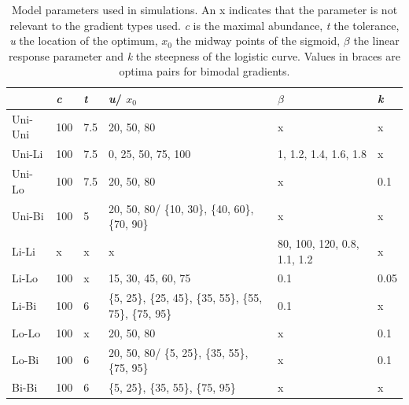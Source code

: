 		\begin{table}[h]
			\small
			\centering
			\caption{Model parameters used in simulations. An x indicates that the parameter is not relevant to the gradient types used. \textit{c} is the maximal abundance, \textit{t} the tolerance, \textit{u} the location of the optimum, $x_0$ the midway points of the sigmoid, $\beta$ the  linear response parameter and \textit{k} the steepness of the logistic curve. Values in braces are optima pairs for bimodal gradients.}
			\begin{tabular}{@{}llllll@{}}
				\toprule
				        & \textit{c} & \textit{t} & \textit{u}/ $x_0$                                 & $\beta$                & \textit{k}     \\
				\hline       
				Uni-Uni & 100 & 7.5 & 20, 50, 80                                                & x                   		  & x     \\
				Uni-Li  & 100 & 7.5 & 0, 25, 50, 75, 100                                        & 1, 1.2, 1.4, 1.6, 1.8       & x     \\
				Uni-Lo  & 100 & 7.5 & 20, 50, 80                                                & x                   		  & 0.1 \\
				Uni-Bi  & 100 & 5   & 20, 50, 80/ \{10, 30\}, \{40, 60\}, \{70, 90\}                        & x                  		  & x  \\
				Li-Li   & x   & x   & x                                                         & 80, 100, 120, 0.8, 1.1, 1.2 & x     \\
				Li-Lo   & 100 & x   & 15, 30, 45, 60, 75                                        & 0.1                   	  & 0.05  \\
				Li-Bi   & 100 & 6   & \{5, 25\}, \{25, 45\}, \{35, 55\}, \{55, 75\}, \{75, 95\} & 0.1                    	  & x     \\
				Lo-Lo   & 100 & x   & 20, 50, 80                                                & x                     	  & 0.1   \\
				Lo-Bi   & 100 & 6   & 20, 50, 80/ \{5, 25\}, \{35, 55\}, \{75, 95\}             & x                      	  & 0.1   \\
				Bi-Bi   & 100 & 6   & \{5, 25\}, \{35, 55\}, \{75, 95\}                         & x                      	  & x     \\
				\toprule
			\end{tabular}
			\label{tab:SimDet}
		\end{table}
